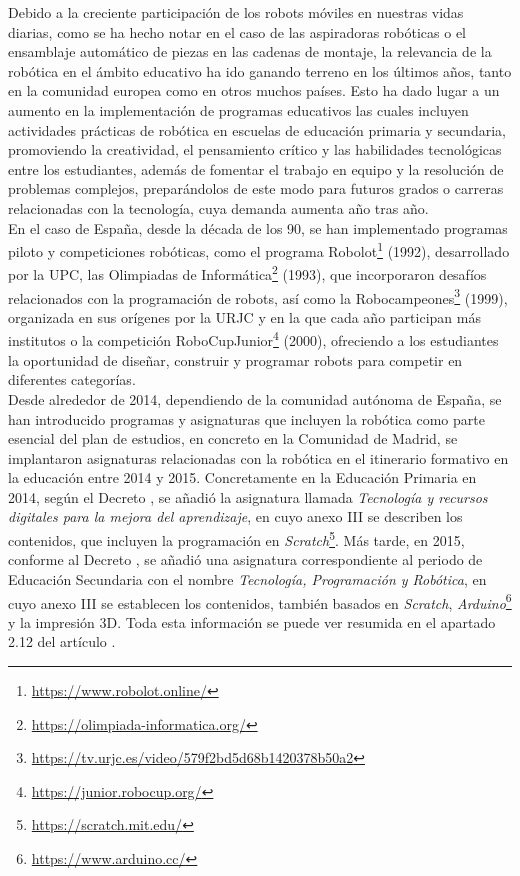 Debido a la creciente participación de los robots móviles en nuestras vidas
diarias, como se ha hecho notar en el caso de las aspiradoras robóticas o el
ensamblaje automático de piezas en las cadenas de montaje, la relevancia de la
robótica en el ámbito educativo ha ido ganando terreno en los últimos años,
tanto en la comunidad europea como en otros muchos países.
Esto ha dado lugar a un aumento en la implementación de programas educativos las
cuales incluyen actividades prácticas de robótica en escuelas de educación
primaria y secundaria, promoviendo la creatividad, el pensamiento crítico y las
habilidades tecnológicas entre los estudiantes, además de fomentar el trabajo en
equipo y la resolución de problemas complejos, preparándolos de este modo para
futuros grados o carreras relacionadas con la tecnología, cuya demanda aumenta
año tras año.
\\

En el caso de España, desde la década de los 90, se han implementado programas
piloto y competiciones robóticas, como el programa Robolot\footnote{
\href{https://www.robolot.online/}{https://www.robolot.online/}} (1992),
desarrollado por la UPC, las Olimpiadas de Informática\footnote{
\href{https://olimpiada-informatica.org/}{https://olimpiada-informatica.org/}}
(1993), que incorporaron desafíos relacionados con la programación de robots,
así como la Robocampeones\footnote{
\href{https://tv.urjc.es/video/579f2bd5d68b1420378b50a2}{https://tv.urjc.es/video/579f2bd5d68b1420378b50a2}}
(1999), organizada en sus orígenes por la URJC y en la que cada año participan
más institutos o la competición RoboCupJunior\footnote{
\href{https://junior.robocup.org/}{https://junior.robocup.org/}} (2000),
ofreciendo a los estudiantes la oportunidad de diseñar, construir y programar
robots para competir en diferentes categorías.
\\

Desde alrededor de 2014, dependiendo de la comunidad autónoma de España, se han
introducido programas y asignaturas que incluyen la robótica como parte esencial
del plan de estudios, en concreto en la Comunidad de Madrid, se implantaron
asignaturas relacionadas con la robótica en el itinerario formativo en la
educación entre 2014 y 2015.
Concretamente en la Educación Primaria en 2014, según el Decreto
\cite{Decreto2014}, se añadió la asignatura llamada \textit{Tecnología y
recursos digitales para la mejora del aprendizaje}, en cuyo anexo III se
describen los contenidos, que incluyen la programación en
\textit{Scratch}\footnote{
\href{https://scratch.mit.edu/}{https://scratch.mit.edu/}}.
Más tarde, en 2015, conforme al Decreto \cite{Decreto2015}, se añadió una
asignatura correspondiente al periodo de Educación Secundaria con el nombre
\textit{Tecnología, Programación y Robótica}, en cuyo anexo III se establecen
los contenidos, también basados en \textit{Scratch}, \textit{Arduino}\footnote{
\href{https://www.arduino.cc/}{https://www.arduino.cc/}} y la impresión 3D.
Toda esta información se puede ver resumida en el apartado 2.12 del artículo
\cite{EducacionRob}.
\\

